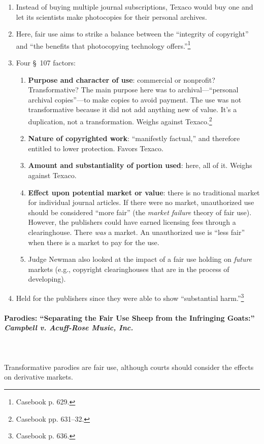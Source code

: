 \begin{enumerate}
    \item Instead of buying multiple journal subscriptions, Texaco would buy 
    one and let its scientists make photocopies for their personal archives.
    \item Here, fair use aims to strike a balance between the ``integrity of 
    copyright'' and ``the benefits that photocopying technology 
    offers.''\footnote{Casebook p. 629.}
    \item Four \S\ 107 factors:
    \begin{enumerate}
        \item \textbf{Purpose and character of use}: commercial or nonprofit? 
        Transformative? The main purpose here was to archival---``personal 
        archival copies''---to make copies to avoid payment. The use was not 
        transformative because it did not add anything new of 
        value. It's a duplication, not a transformation. 
        Weighs against Texaco.\footnote{Casebook pp. 631--32.}
        \item \textbf{Nature of copyrighted work}: ``manifestly factual,'' and 
        therefore entitled to lower protection. Favors Texaco.
        \item \textbf{Amount and substantiality of portion used}: here, all of 
        it. Weighs against Texaco.
        \item \textbf{Effect upon potential market or value}: there is no 
        traditional market for individual journal articles. If there were no 
        market, unauthorized use should be considered ``more fair'' (the 
        \emph{market failure} theory of fair use). However, the publishers 
        could have earned licensing fees through a clearinghouse. There 
        \emph{was} a market. An unauthorized use is ``less fair'' when there 
        is a market to pay for the use.
        \item Judge Newman also looked at the impact of a fair use holding on 
        \emph{future} markets (e.g., copyright clearinghouses that are in the 
        process of developing).
    \end{enumerate}
    \item Held for the publishers since they were able to show ``substantial 
    harm.''\footnote{Casebook p. 636.}
\end{enumerate}

\paragraph{Parodies: ``Separating the Fair Use Sheep from the Infringing Goats:'' 
\emph{Campbell v. Acuff-Rose Music, Inc.}}
~\\\\
Transformative parodies are fair use, although courts should consider the 
effects on derivative markets.

